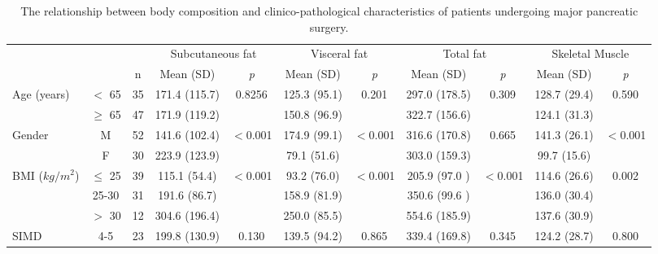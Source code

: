 \begin{sidewaystable}[p]
	\caption{The relationship between body composition and clinico-pathological characteristics of patients undergoing major pancreatic surgery.}
	\label{table:bc_clinical}
	\footnotesize
	\renewcommand{\arraystretch}{1.2} %
	\setlength{\tabcolsep}{9pt} %
	\centering
	\begin{tabular}{|l c c | c c| c c | c c | c c|}
		\hline
		                          &           &    & \multicolumn{2}{c|}{Subcutaneous fat} & \multicolumn{2}{c|}{Visceral fat} & \multicolumn{2}{c|}{Total fat} & \multicolumn{2}{c|}{Skeletal Muscle} \\
		                          &           & n  & Mean (SD)     & \textit{p}            & Mean (SD)     & \textit{p}        & Mean (SD)     & \textit{p}     & Mean (SD)    & \textit{p}            \\ \hline
		Age (years)               & $<$ 65    & 35 & 171.4 (115.7) & 0.8256                & 125.3 (95.1)  & 0.201             & 297.0 (178.5) & 0.309          & 128.7 (29.4) & 0.590                 \\
		                          & $\geq$ 65 & 47 & 171.9 (119.2) &                       & 150.8 (96.9)  &                   & 322.7 (156.6) &                & 124.1 (31.3) &  \\
		Gender                    & M         & 52 & 141.6 (102.4) & $<$0.001              & 174.9 (99.1)  & $<$0.001          & 316.6 (170.8) & 0.665          & 141.3 (26.1) & $<$0.001              \\
		                          & F         & 30 & 223.9 (123.9) &                       & 79.1 (51.6)   &                   & 303.0 (159.3) &                & 99.7 (15.6)  &  \\
		BMI ($kg/m^2$)            & $\leq$ 25 & 39 & 115.1 (54.4)  & $<$0.001              & 93.2 (76.0)   & $<$0.001          & 205.9 (97.0 ) & $<$0.001       & 114.6 (26.6) & 0.002                 \\
		                          & 25-30     & 31 & 191.6 (86.7)  &                       & 158.9 (81.9)  &                   & 350.6 (99.6 ) &                & 136.0 (30.4) &  \\
		                          & $>$ 30    & 12 & 304.6 (196.4) &                       & 250.0 (85.5)  &                   & 554.6 (185.9) &                & 137.6 (30.9) &  \\
		SIMD                      & 4-5       & 23 & 199.8 (130.9) & 0.130                 & 139.5 (94.2)  & 0.865             & 339.4 (169.8) & 0.345          & 124.2 (28.7) & 0.800                 \\

\end{tabular}
\end{sidewaystable}
